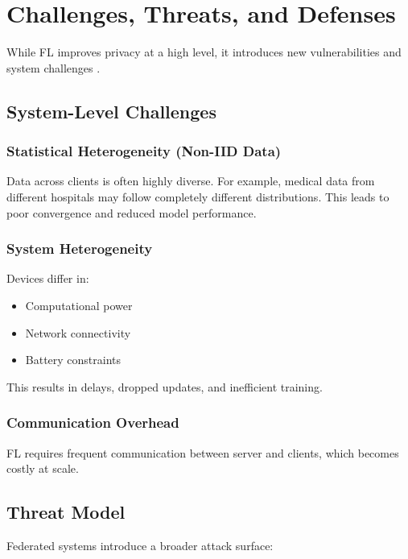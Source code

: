 
\chapter{Challenges, Threats, and Defenses}
\label{ch:chapter4}

While FL improves privacy at a high level, it introduces new vulnerabilities and system challenges \cite{rodriguez2020federated}.

\section{System-Level Challenges}

\subsection{Statistical Heterogeneity (Non-IID Data)}

Data across clients is often highly diverse. For example, medical data from different hospitals may follow completely different distributions. This leads to poor convergence and reduced model performance.

\subsection{System Heterogeneity}

Devices differ in:
\begin{itemize}
    \item Computational power
    \item Network connectivity
    \item Battery constraints
\end{itemize}

This results in delays, dropped updates, and inefficient training.

\subsection{Communication Overhead}

FL requires frequent communication between server and clients, which becomes costly at scale.

\section{Threat Model}

Federated systems introduce a broader attack surface:

